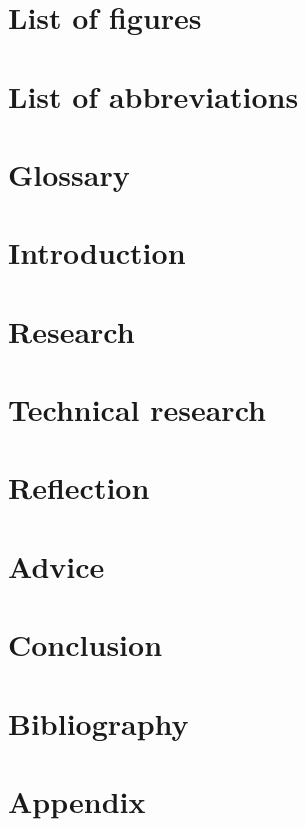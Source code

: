 \documentclass{article}
\begin{document}
\newpage
\section*{List of figures}


\newpage
\section*{List of abbreviations}

\newpage
\section*{Glossary}

\newpage
\setcounter{section}{0}
\section{Introduction}


\newpage
\section{Research}

\newpage
\section{Technical research}

\newpage
\section{Reflection}

\newpage
\section{Advice}

\newpage
\section{Conclusion}

\newpage
\section{Bibliography}

\newpage
\section{Appendix}
\end{document}
